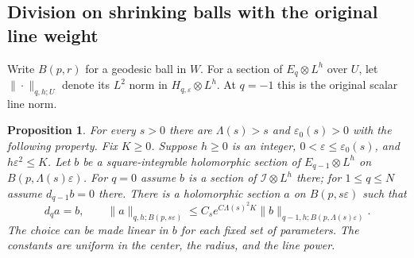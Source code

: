 \documentclass[11pt,reqno]{amsart}
\numberwithin{equation}{section}
\newtheorem{proposition}[theorem]{Proposition}
\theoremstyle{definition}
\theoremstyle{remark}
\newcommand{\cI}{\mathcal I}
\begin{document}
\subsection{Division on shrinking balls with the original line weight}

Write $B(p,r)$ for a geodesic ball in $W$.  For a section of
$E_q\otimes L^h$ over $U$, let $\|\cdot\|_{q,h;U}$ denote its
$L^2$ norm in $H_{q,\varepsilon}\otimes L^h$.  At $q=-1$ this is
the original scalar line norm.

\begin{proposition}\label{ana:microscopic-division}
For every $s>0$ there are $\Lambda(s)>s$ and
$\varepsilon_0(s)>0$ with the following property.  Fix $K\geq0$.
Suppose $h\geq0$ is an integer,
$0<\varepsilon\leq\varepsilon_0(s)$, and $h\varepsilon^2\leq K$.
Let $b$ be a square-integrable holomorphic section of
$E_{q-1}\otimes L^h$ on $B(p,\Lambda(s)\varepsilon)$.
For $q=0$ assume $b$ is a section of $\cI\otimes L^h$ there;
for $1\leq q\leq N$ assume $d_{q-1}b=0$ there.
There is a holomorphic section $a$ on $B(p,s\varepsilon)$ such that
\begin{equation}\label{ana:micro-bound}
 d_qa=b,
 \qquad
 \|a\|_{q,h;B(p,s\varepsilon)}
 \leq C_s e^{C\Lambda(s)^2K}
 \|b\|_{q-1,h;B(p,\Lambda(s)\varepsilon)}.
\end{equation}
The choice can be made linear in $b$ for each fixed set of parameters.
The constants are uniform in the center, the radius, and the line power.
\end{proposition}
\end{document}
